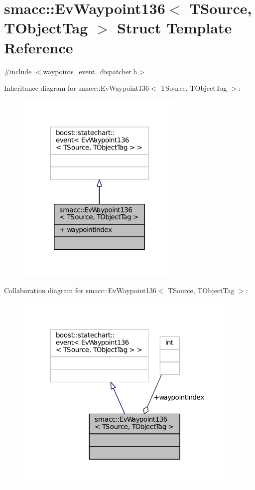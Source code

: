 \hypertarget{structsmacc_1_1EvWaypoint136}{}\section{smacc\+:\+:Ev\+Waypoint136$<$ T\+Source, T\+Object\+Tag $>$ Struct Template Reference}
\label{structsmacc_1_1EvWaypoint136}


{\ttfamily \#include $<$waypoints\+\_\+event\+\_\+dispatcher.\+h$>$}



Inheritance diagram for smacc\+:\+:Ev\+Waypoint136$<$ T\+Source, T\+Object\+Tag $>$\+:
\nopagebreak
\begin{figure}[H]
\begin{center}
\leavevmode
\includegraphics[width=227pt]{structsmacc_1_1EvWaypoint136__inherit__graph}
\end{center}
\end{figure}


Collaboration diagram for smacc\+:\+:Ev\+Waypoint136$<$ T\+Source, T\+Object\+Tag $>$\+:
\nopagebreak
\begin{figure}[H]
\begin{center}
\leavevmode
\includegraphics[width=312pt]{structsmacc_1_1EvWaypoint136__coll__graph}
\end{center}
\end{figure}
